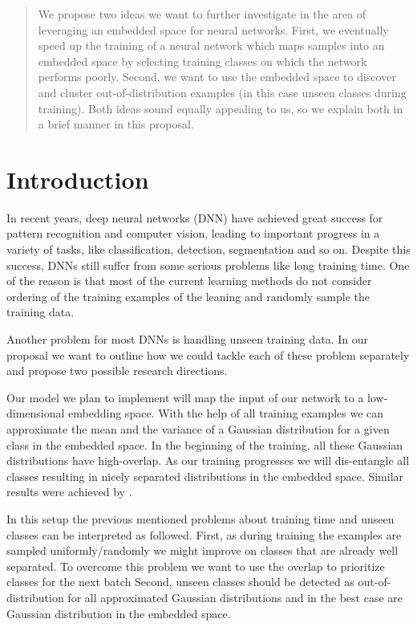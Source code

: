 \begin{abstract}
	We propose two ideas we want to further investigate in the area of leveraging an embedded space for neural networks. First, we eventually speed up the training of a neural network which maps samples into an embedded space by selecting training classes on which the network performs poorly. Second, we want to use the embedded space to discover and cluster out-of-distribution examples (in this case unseen classes during training). Both ideas sound equally appealing to us, so we explain both in a brief manner in this proposal.
\end{abstract}

\section{Introduction}
In recent years, deep neural networks (DNN) have achieved great success for pattern recognition and computer vision, leading to important progress in a variety of tasks, like classification, detection, segmentation and so on. Despite this success, DNNs still suffer from some serious problems like long training time. One of the reason is that most of the current learning methods do not consider ordering of the training examples of the leaning and randomly sample the training data. 

Another problem for most DNNs is handling unseen training data. In our proposal we want to outline how we could tackle each of these problem separately and propose two possible research directions.

Our model we plan to implement will map the input of our network to a low-dimensional embedding space. With the help of all training examples we can approximate the mean and the variance of a Gaussian distribution for a given class in the embedded space. In the beginning of the training, all these Gaussian distributions have high-overlap. As our training progresses we will dis-entangle all classes resulting in nicely separated distributions in the embedded space. Similar results were achieved by \cite{yang2018robust}.

In this setup the previous mentioned problems about training time and unseen classes can be interpreted as followed.
First, as during training the examples are sampled uniformly/randomly we might improve on classes that are already well separated. To overcome this problem we want to use the overlap to prioritize classes for the next batch
Second, unseen classes should be detected as out-of-distribution for all approximated Gaussian distributions and in the best case are Gaussian distribution in the embedded space.

